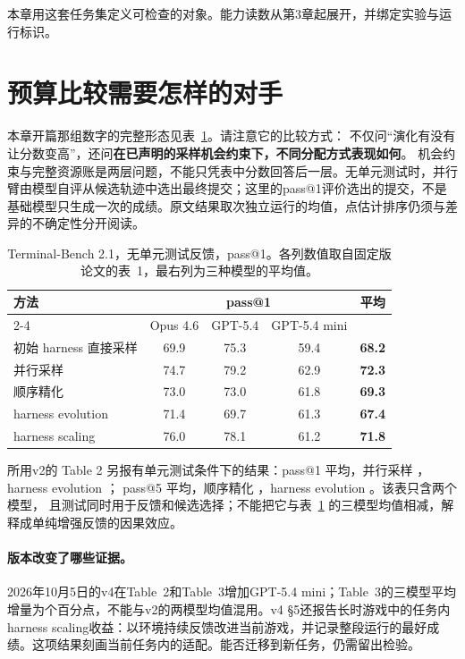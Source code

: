 本章用这套任务集定义可检查的对象。能力读数从第3章起展开，并绑定实验与运行标识。

\section{预算比较需要怎样的对手}
\label{sec:firstcontrast}

本章开篇那组数字的完整形态见表~\ref{tab:harness}。请注意它的比较方式：
不仅问“演化有没有让分数变高”，还问\textbf{在已声明的采样机会约束下，不同分配方式表现如何}。
机会约束与完整资源账是两层问题，不能只凭表中分数回答后一层。无单元测试时，并行臂由模型自评从候选轨迹中选出最终提交；这里的pass@1评价选出的提交，不是基础模型只生成一次的成绩。原文结果取次独立运行的均值，点估计排序仍须与差异的不确定性分开阅读。

\begin{table}[htbp]
\centering
\small
\begin{tabular}{@{}p{3.4cm}cccc@{}}
\toprule
方法 & \multicolumn{3}{c}{pass@1} & 平均 \\
\cmidrule(lr){2-4}
 & Opus 4.6 & GPT-5.4 & GPT-5.4 mini & \\
\midrule
初始 harness 直接采样 & 69.9 & 75.3 & 59.4 & \textbf{68.2} \\
并行采样 & 74.7 & 79.2 & 62.9 & \textbf{72.3} \\
顺序精化 & 73.0 & 73.0 & 61.8 & \textbf{69.3} \\
harness evolution & 71.4 & 69.7 & 61.3 & \textbf{67.4} \\
harness scaling & 76.0 & 78.1 & 61.2 & \textbf{71.8} \\
\bottomrule
\end{tabular}
\caption{Terminal-Bench 2.1，无单元测试反馈，pass@1。各列数值取自固定版论文的表~1，最右列为三种模型的平均值\cite{harness-eval-2607}。}
\label{tab:harness}
\end{table}

所用v2的 Table 2 另报有单元测试条件下的结果：pass@1 平均，并行采样 ，harness evolution ；
pass@5 平均，顺序精化 ，harness evolution 。该表只含两个模型，
且测试同时用于反馈和候选选择；不能把它与表~\ref{tab:harness} 的三模型均值相减，解释成单纯增强反馈的因果效应。

\paragraph{版本改变了哪些证据。}
2026年10月5日的v4在Table~2和Table~3增加GPT-5.4 mini；Table~3的三模型平均增量为个百分点，不能与v2的两模型均值混用。v4 §5还报告长时游戏中的任务内harness scaling收益：以环境持续反馈改进当前游戏，并记录整段运行的最好成绩\cite{harness-eval-2607-v4}。这项结果刻画当前任务内的适配。能否迁移到新任务，仍需留出检验。

